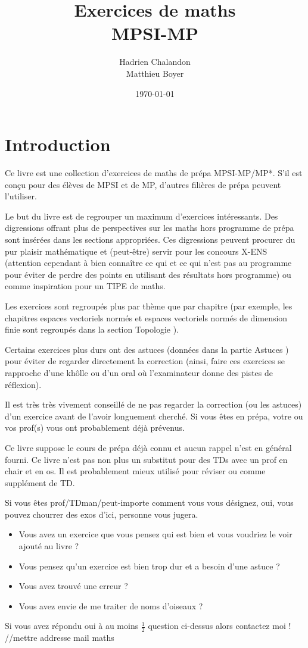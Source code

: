 \documentclass[12pt,a4paper]{exo_book}
\title{Exercices de maths \\ MPSI-MP}
\author{Hadrien {\sc Chalandon} \\ Matthieu {\sc Boyer}}
\date{\today}
\begin{document}
\chapter*{Introduction}
Ce livre est une collection d'exercices de maths de prépa MPSI-MP/MP*. S'il est conçu pour des élèves de MPSI et de MP, d'autres filières de prépa peuvent l'utiliser.

Le but du livre est de regrouper un maximum d'exercices intéressants. Des digressions offrant plus de perspectives sur les maths hors programme de prépa sont insérées dans les sections appropriées. Ces digressions peuvent procurer du pur plaisir mathématique et (peut-être) servir pour les concours X-ENS (attention cependant à bien connaître ce qui et ce qui n'est pas au programme pour éviter de perdre des points en utilisant des résultats hors programme) ou comme inspiration pour un TIPE de maths.

Les exercices sont regroupés plus par thème que par chapitre (par exemple, les chapitres espaces vectoriels normés et espaces vectoriels normés de dimension finie sont regroupés dans la section \og Topologie \fg).

Certains exercices plus durs ont des astuces (données dans la partie \og Astuces \fg) pour éviter de regarder directement la correction (ainsi, faire ces exercices se rapproche d'une khôlle ou d'un oral où l'examinateur donne des pistes de réflexion).

Il est très très vivement conseillé de ne pas regarder la correction (ou les astuces) d'un exercice avant de l'avoir longuement cherché. Si vous êtes en prépa, votre ou vos prof(s) vous ont probablement déjà prévenus.

Ce livre suppose le cours de prépa déjà connu et aucun rappel n'est en général fourni. Ce livre n'est pas non plus un substitut pour des TDs avec un prof en chair et en os. Il est probablement mieux utilisé pour réviser ou comme supplément de TD.

Si vous êtes prof/TDman/peut-importe comment vous vous désignez, oui, vous pouvez chourrer des exos d'ici, personne vous jugera.

\begin{itemize}
    \item Vous avez un exercice que vous pensez qui est bien et vous voudriez le voir ajouté au livre ?
    \item Vous pensez qu'un exercice est bien trop dur et a besoin d'une astuce ?
    \item Vous avez trouvé une erreur ?
    \item Vous avez envie de me traiter de noms d'oiseaux ?
\end{itemize}
Si vous avez répondu \og oui \fg à au moins $\frac{1}{2}$ question ci-dessus alors contactez moi ! //mettre addresse mail maths 
\end{document}
